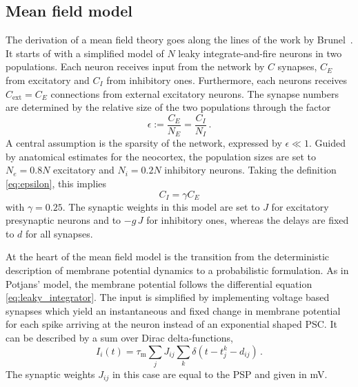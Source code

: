 \subsection{Mean field model}
The derivation of a mean field theory goes along the 
lines of the work by Brunel~\cite{brunel2000}.
It starts of with a simplified model of 
$N$ leaky integrate-and-fire neurons in two populations. 
Each neuron receives input from the network by $C$ synapses, 
$C_E$ from excitatory and $C_I$ from inhibitory ones. 
Furthermore, each neurons receives $C_\text{ext} = C_E$ connections from 
external excitatory neurons.
The synapse numbers 
are determined by the relative size of the two populations through the factor
\begin{equation}
    \epsilon := \frac{C_E}{N_E} = \frac{C_I}{N_I} \,.
    \label{eq:epsilon}
\end{equation}
A central assumption is the sparsity of the network, expressed by $\epsilon \ll 1$.
Guided by anatomical estimates for the neocortex, the population sizes are set to
$N_e = 0.8N$ excitatory and $N_i = 0.2N$ inhibitory neurons. Taking the definition
\eqref{eq:epsilon}, this implies 
\begin{equation}
    C_I = \gamma C_E 	
 \label{eq:C_I}
\end{equation}
with $\gamma = 0.25$. The synaptic weights in this model are set to $J$ for 
excitatory presynaptic neurons and to $-g\, J$ for inhibitory ones, 
whereas the delays are fixed to $d$ for all synapses. 

At the heart of the mean field model
is the transition from the deterministic description of membrane potential 
dynamics to a probabilistic formulation. 
As in Potjans' model, the membrane potential follows
the differential equation \eqref{eq:leaky_integrator}. The input is simplified 
by implementing voltage based synapses which
yield an instantaneous and fixed change in membrane potential
for each spike arriving at the neuron instead of an exponential shaped PSC.
It can be described by a sum over Dirac delta-functions, 
\begin{equation}
    I_i(t) = \tau_\text{m} \sum_j J_{ij} \sum_k \delta(t - t_j^k - d_{ij}) \,.
    \label{eq:input_const_volt}
\end{equation}
The synaptic weights $J_{ij}$ in this case are equal to the PSP and given in mV.  

